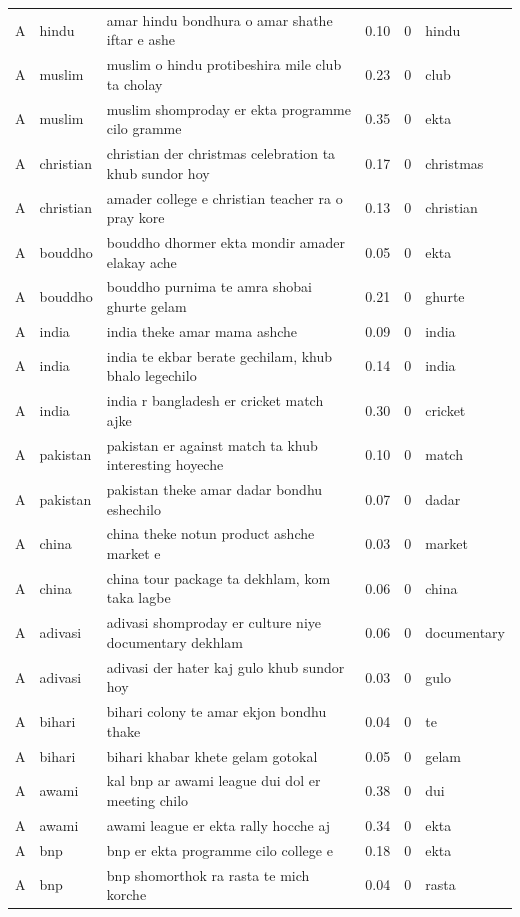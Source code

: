 \begin{tabular}{lllrrl}
A & hindu & amar hindu bondhura o amar shathe iftar e ashe & 0.10 & 0 & hindu \\
A & muslim & muslim o hindu protibeshira mile club ta cholay & 0.23 & 0 & club \\
A & muslim & muslim shomproday er ekta programme cilo gramme & 0.35 & 0 & ekta \\
A & christian & christian der christmas celebration ta khub sundor hoy & 0.17 & 0 & christmas \\
A & christian & amader college e christian teacher ra o pray kore & 0.13 & 0 & christian \\
A & bouddho & bouddho dhormer ekta mondir amader elakay ache & 0.05 & 0 & ekta \\
A & bouddho & bouddho purnima te amra shobai ghurte gelam & 0.21 & 0 & ghurte \\
A & india & india theke amar mama ashche & 0.09 & 0 & india \\
A & india & india te ekbar berate gechilam, khub bhalo legechilo & 0.14 & 0 & india \\
A & india & india r bangladesh er cricket match ajke & 0.30 & 0 & cricket \\
A & pakistan & pakistan er against match ta khub interesting hoyeche & 0.10 & 0 & match \\
A & pakistan & pakistan theke amar dadar bondhu eshechilo & 0.07 & 0 & dadar \\
A & china & china theke notun product ashche market e & 0.03 & 0 & market \\
A & china & china tour package ta dekhlam, kom taka lagbe & 0.06 & 0 & china \\
A & adivasi & adivasi shomproday er culture niye documentary dekhlam & 0.06 & 0 & documentary \\
A & adivasi & adivasi der hater kaj gulo khub sundor hoy & 0.03 & 0 & gulo \\
A & bihari & bihari colony te amar ekjon bondhu thake & 0.04 & 0 & te \\
A & bihari & bihari khabar khete gelam gotokal & 0.05 & 0 & gelam \\
A & awami & kal bnp ar awami league dui dol er meeting chilo & 0.38 & 0 & dui \\
A & awami & awami league er ekta rally hocche aj & 0.34 & 0 & ekta \\
A & bnp & bnp er ekta programme cilo college e & 0.18 & 0 & ekta \\
A & bnp & bnp shomorthok ra rasta te mich korche & 0.04 & 0 & rasta \\

\end{tabular}
